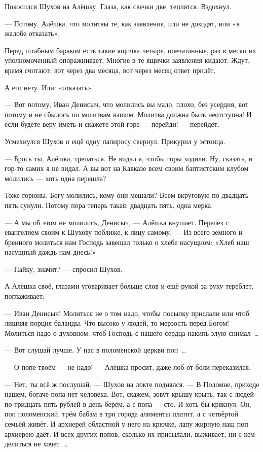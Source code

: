 Покосился Шухов на Алёшку. Глаза, как свечки две, теплятся. Вздохнул.

--- Потому, Алёшка, что молитвы те, как заявления, или не доходят, или «в жалобе отказать».

Перед штабным бараком есть такие ящичка четыре, опечатанные, раз в месяц их уполномоченный 
опоражнивает. Многие в те ящички заявления кидают. Ждут, время считают: вот через два месяца, 
вот через месяц ответ придёт.

А его нету. Или: «отказать».

--- Вот потому, Иван Денисыч, что молились вы мало, плохо, без усердия, вот потому и не сбылось 
по молитвам вашим. Молитва должна быть неотступна! И если будете веру иметь и скажете этой 
горе --- перейди! --- перейдёт.

Усмехнулся Шухов и ещё одну папиросу свернул. Прикурил у эстонца.

--- Брось ты, Алёшка, трепаться. Не видал я, чтобы горы ходили. Ну, сказать, и гор-то самих я не 
видал. А вы вот на Кавказе всем своим баптистским клубом молились --- хоть одна перешла?

Тоже горюны: Богу молились, кому они мешали? Всем вкруговую по двадцать пять сунули. Потому 
пора теперь такая: двадцать пять, одна мерка.

--- А мы об этом не молились, Денисыч, --- Алёшка внушает. Перелез с евангелием своим к Шухову 
поближе, к лицу самому. --- Из всего земного и бренного молиться нам Господь завещал только о 
хлебе насущном: «Хлеб наш насущный даждь нам днесь!»

--- Пайку, значит? --- спросил Шухов.

А Алёшка своё, глазами уговаривает больше слов и ещё рукой за руку тереблет, поглаживает:

--- Иван Денисыч! Молиться не о том надо, чтобы посылку прислали или чтоб лишняя порция 
баланды. Что высоко у людей, то мерзость перед Богом! Молиться надо о духовном: чтоб Господь с 
нашего сердца накипь злую снимал~\dots{}

--- Вот слушай лучше. У нас в поломенской церкви поп~\dots{}

--- О попе твоём --- не надо! --- Алёшка просит, даже лоб от боли переказился.

--- Нет, ты всё ж послушай. --- Шухов на локте поднялся. --- В Поломне, приходе нашем, богаче попа 
нет человека. Вот, скажем, зовут крышу крыть, так с людей по тридцать пять рублей в день берём, 
а с попа --- сто. И хоть бы крякнул. Он, поп поломенский, трём бабам в три города алименты 
платит, а с четвёртой семьёй живёт. И архиерей областной у него на крючке, лапу жирную наш поп 
архиерею даёт. И всех других попов, сколько их присылали, выживает, ни с кем делиться не 
хочет~\dots{}

